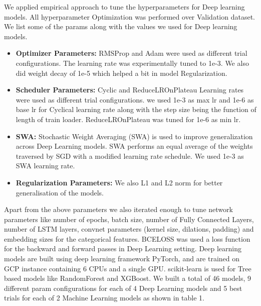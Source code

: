 We applied empirical approach to tune the hyperparameters for Deep learning models. All hyperparameter Optimization
was performed over Validation dataset. We list some of the params along with the values we used for Deep learning models.
  \begin{itemize}
    \item {\bf Optimizer Parameters:} RMSProp and Adam were used as different trial configurations. The learning rate 
    was experimentally tuned to 1e-3. We also did weight decay of 1e-5 which helped a bit in model Regularization.
    \item {\bf Scheduler Parameters:} Cyclic and ReduceLROnPlateau Learning rates were used as different trial configurations.
    we used 1e-3 as max lr and 1e-6 as base lr for Cyclical learning rate along with the step size being the function of
    length of train loader. ReduceLROnPlateau was tuned for 1e-6 as min lr.
    \item {\bf SWA:} Stochastic Weight Averaging (SWA) is used to improve generalization across Deep Learning
    models. SWA performs an equal average of the weights traversed by SGD with a modified learning rate schedule. We used 
    1e-3 as SWA learning rate.
    \item {\bf Regularization Parameters:} We also L1 and L2 norm for better generalisation of the models.
  \end{itemize}
Apart from the above parameters we also iterated enough to tune network parameters like number of epochs, batch size, 
number of Fully Connected Layers, number of LSTM layers, convnet parameters (kernel size, dilations, padding)
and embedding sizes for the categorical features. BCELOSS was used a loss function for the backward and forward
passes in Deep Learning setting. Deep learning models are built using deep learning framework
PyTorch, and are trained on GCP instance containing 6 CPUs and a single GPU. scikit-learn is used for Tree
based models like RandomForest and XGBoost. We built a total of 46 models, 9 different param configurations for each of 4 
Deep Learning models and 5 best trials for each of 2 Machine Learning models as shown in table 1.

